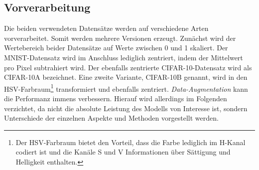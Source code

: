 

\subsection{Vorverarbeitung}
Die beiden verwendeten Datensätze werden auf verschiedene Arten vorverarbeitet. Somit werden mehrere Versionen erzeugt. Zunächst wird der Wertebereich beider Datensätze auf Werte zwischen 0 und 1 skaliert. Der MNIST-Datensatz wird im Anschluss lediglich zentriert, indem der Mittelwert pro Pixel subtrahiert wird. Der ebenfalls zentrierte CIFAR-10-Datensatz wird als CIFAR-10A bezeichnet. Eine zweite Variante, CIFAR-10B genannt, wird in den HSV-Farbraum\footnote{Der HSV-Farbraum bietet den Vorteil, dass die Farbe lediglich im H-Kanal codiert ist und die Kanäle S und V Informationen über Sättigung und Helligkeit enthalten.} transformiert und ebenfalls zentriert. 
\textit{Data-Augmentation} kann die Performanz immens verbessern. Hierauf wird allerdings im Folgenden verzichtet, da nicht die absolute Leistung des Modells von Interesse ist, sondern Unterschiede der einzelnen Aspekte und Methoden vorgestellt werden. 

